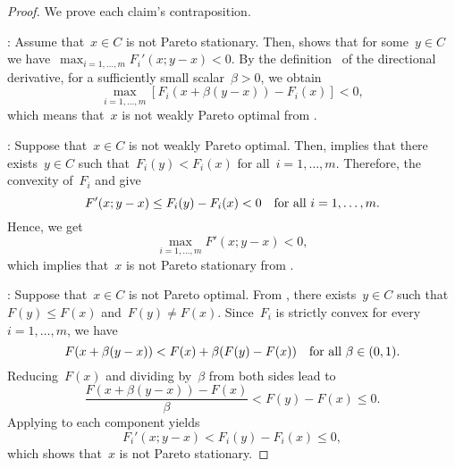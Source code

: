 \documentclass[../main]{subfiles}
\begin{document}
\begin{proof}
    We prove each claim's contraposition.

    :
    Assume that~$x \in C$ is not Pareto stationary.
    Then,  shows that for some~$y \in C$ we have~$\max_{i = 1, \dots, m} F_i'(x; y - x) < 0$.
    By the definition~ of the directional derivative, for a sufficiently small scalar~$\beta > 0$, we obtain
    \begin{equation}
        \max_{i = 1, \dots, m} [ F_i(x + \beta (y - x)) - F_i(x) ] < 0
        ,\end{equation}
    which means that~$x$ is not weakly Pareto optimal from .

    :
    Suppose that~$x \in C$ is not weakly Pareto optimal.
    Then,  implies that there exists~$y \in C$ such that~$F_i(y) < F_i(x)$ for all~$i = 1, \dots, m$.
    Therefore, the convexity of~$F_i$ and  give
    \begin{equation}
        F'(x; y - x) \le F_i(y) - F_i(x) < 0 \quad \text{for all~$i = 1, \dots, m$}
        .\end{equation}
    Hence, we get
    \begin{equation}
        \max_{i = 1, \dots, m} F'(x; y - x) < 0
        ,\end{equation}
    which implies that~$x$ is not Pareto stationary from .

    :
    Suppose that~$x \in C$ is not Pareto optimal.
    From , there exists~$y \in C$ such that~$F(y) \le F(x)$ and~$F(y) \neq F(x)$.
    Since~$F_i$ is strictly convex for every~$i = 1, \dots, m$, we have
    \begin{equation}
        F(x + \beta(y - x)) < F(x) + \beta (F(y) - F(x)) \quad \text{for all~$\beta \in (0, 1)$}
        .\end{equation}
    Reducing~$F(x)$ and dividing by~$\beta$ from both sides lead to
    \begin{equation}
        \frac{F(x + \beta(y - x)) - F(x)}{\beta} < F(y) - F(x) \le 0
        .\end{equation}
    Applying  to each component yields
    \begin{equation}
        F_i'(x; y - x) < F_i(y) - F_i(x) \le 0
        ,\end{equation}
    which shows that~$x$ is not Pareto stationary.
\end{proof}
\end{document}
